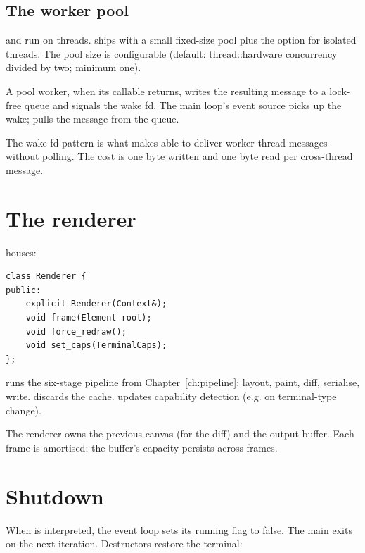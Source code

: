 \subsection*{The worker pool}

 and  run on threads. \maya{}
ships with a small fixed-size pool plus the option for isolated
threads. The pool size is configurable (default: thread::hardware
concurrency divided by two; minimum one).

A pool worker, when its callable returns, writes the resulting
message to a lock-free queue and signals the wake fd. The main
loop's event source picks up the wake;  pulls the
message from the queue.

\begin{aside}
The wake-fd pattern is what makes \maya{} able to deliver
worker-thread messages without polling. The cost is one byte
written and one byte read per cross-thread message.
\end{aside}

\section{The renderer}

 houses:

\begin{lstlisting}
class Renderer {
public:
    explicit Renderer(Context&);
    void frame(Element root);
    void force_redraw();
    void set_caps(TerminalCaps);
};
\end{lstlisting}

 runs the six-stage pipeline from
Chapter~\ref{ch:pipeline}: layout, paint, diff, serialise,
write.  discards the cache. 
updates capability detection (e.g. on terminal-type change).

The renderer owns the previous canvas (for the diff) and the
output buffer. Each frame is amortised; the buffer's capacity
persists across frames.

\section{Shutdown}

When  is interpreted, the event loop sets its
running flag to false. The main  exits on the next
iteration. Destructors restore the terminal:

